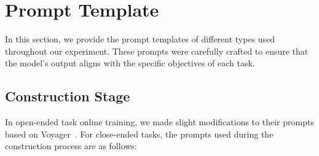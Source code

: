 \section{Prompt Template}
\label{app:prompt}
In this section, we provide the prompt templates of different types used throughout our experiment. These prompts were carefully crafted to ensure that the model's output aligns with the specific objectives of each task.

\subsection{Construction Stage}
In open-ended task online training, we made slight modifications to their prompts based on Voyager~\citep{wang2023voyager}. For close-ended tasks, the prompts used during the construction process are as follows:
